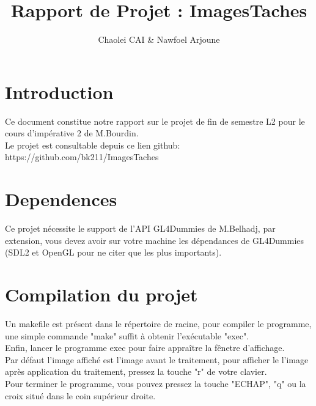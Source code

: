 \documentclass[12pt, letterpaper]{article}
\title{Rapport de Projet : ImagesTaches}
\author{Chaolei CAI \& Nawfoel Arjoune}
\begin{document}
\begin{titlepage}
\maketitle
\end{titlepage}

\tableofcontents
\section{Introduction}
Ce document constitue notre rapport sur le projet de fin de semestre L2 pour le cours d'impérative 2 de M.Bourdin. \\
Le projet est consultable depuis ce lien github: https://github.com/bk211/ImagesTaches\\


\section{Dependences}
Ce projet nécessite le support de l'API GL4Dummies de M.Belhadj, 
par extension, vous devez avoir sur votre machine les dépendances de GL4Dummies 
(SDL2 et OpenGL pour ne citer que les plus importants).

\section{Compilation du projet}
Un makefile est présent dans le répertoire de racine, pour compiler le programme, une simple
commande "make" suffit à obtenir l'exécutable "exec".\\
Enfin, lancer le programme exec pour faire appraître la fênetre d'affichage.\\
Par défaut l'image affiché est l'image avant le traitement, 
pour afficher le l'image après application du traitement, pressez la touche "r" de votre clavier.\\
Pour terminer le programme, vous pouvez pressez la touche "ECHAP", "q" ou la croix situé dans le coin supérieur droite.
\end{document}
